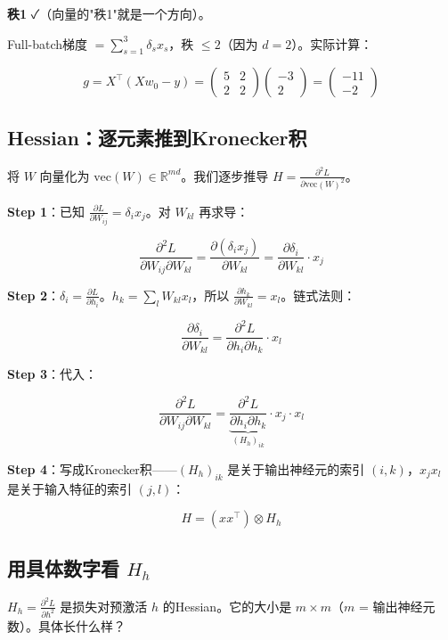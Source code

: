 \documentclass[12pt,a4paper]{article}
\begin{document}
\textbf{秩1} ✓（向量的"秩1"就是一个方向）。

Full-batch梯度 $= \sum_{s=1}^3 \delta_s x_s$，秩 $\le 2$（因为 $d=2$）。实际计算：


\[g = X^\top(Xw_0 - y) = \begin{pmatrix}5&2\\2&2\end{pmatrix}\begin{pmatrix}-3\\2\end{pmatrix} = \begin{pmatrix}-11\\-2\end{pmatrix}\]


\subsection{Hessian：逐元素推到Kronecker积}

将 $W$ 向量化为 $\text{vec}(W) \in \mathbb{R}^{md}$。我们逐步推导 $H = \frac{\partial^2 L}{\partial \text{vec}(W)^2}$。

\textbf{Step 1}：已知 $\frac{\partial L}{\partial W_{ij}} = \delta_i x_j$。对 $W_{kl}$ 再求导：


\[\frac{\partial^2 L}{\partial W_{ij} \partial W_{kl}} = \frac{\partial(\delta_i x_j)}{\partial W_{kl}} = \frac{\partial \delta_i}{\partial W_{kl}} \cdot x_j\]

\textbf{Step 2}：$\delta_i = \frac{\partial L}{\partial h_i}$。$h_k = \sum_l W_{kl}x_l$，所以 $\frac{\partial h_k}{\partial W_{kl}} = x_l$。链式法则：


\[\frac{\partial \delta_i}{\partial W_{kl}} = \frac{\partial^2 L}{\partial h_i \partial h_k} \cdot x_l\]

\textbf{Step 3}：代入：


\[\frac{\partial^2 L}{\partial W_{ij} \partial W_{kl}} = \underbrace{\frac{\partial^2 L}{\partial h_i \partial h_k}}_{(H_h)_{ik}} \cdot x_j \cdot x_l\]

\textbf{Step 4}：写成Kronecker积——$(H_h)_{ik}$ 是关于输出神经元的索引 $(i,k)$，$x_j x_l$ 是关于输入特征的索引 $(j,l)$：


\[\boxed{H = (xx^\top) \otimes H_h}\]


\subsection{用具体数字看 $H_h$}

$H_h = \frac{\partial^2 L}{\partial h^2}$ 是损失对预激活 $h$ 的Hessian。它的大小是 $m \times m$（$m$ = 输出神经元数）。具体长什么样？
\end{document}
